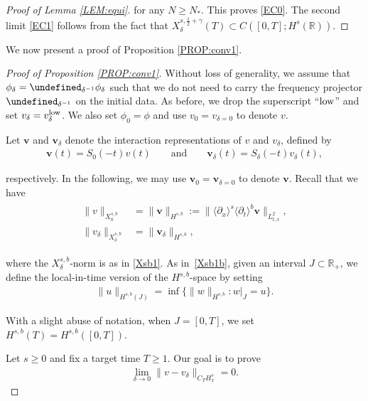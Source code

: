\documentclass[letterpaper, 11pt,  reqno]{amsart}
\newcommand{\1}{\hspace{0.5mm}\textup{I}\hspace{0.5mm}}
\newcommand{\noi}{\noindent}
\newcommand{\R}{\mathbb{R}}
\let\P= \undefined
\newcommand{\P}{\mathbf{P}}
\newcommand{\low}{\textup{low}}
\newcommand{\dl}{\delta}
\newcommand{\dx}{\partial_x}
\newcommand{\dt}{\partial_t}
\newcommand{\jb}[1]
{\langle #1 \rangle}
\newcommand{\vv}{\mathbf{v}}
\numberwithin{equation}{section}
\numberwithin{theorem}{section}
\begin{document}
\begin{proof}[Proof of Lemma \ref{LEM:equi}]
\noi
for any $N \ge N_*$.
This proves 
 \eqref{EC0}.
The second limit  \eqref{EC1}  follows from the fact that 
$X^{s,\frac12+\gamma}_\dl(T)\subset C([0,T];H^s(\R))$.
\end{proof}






We now present a proof of Proposition \ref{PROP:conv1}.


\begin{proof}[Proof of Proposition \ref{PROP:conv1}]
Without loss of generality, we assume that 
$\phi_ \dl = \P_{ \dl^{-1}} \phi_\dl$
such that we do not need to carry the frequency projector
$\P_{ \dl^{-1}}$ on the initial data.
As before,  we drop the superscript ``$\low$''
and set 
$v_\dl = v_\dl^\low$.
We also set $\phi_0 = \phi$
and use $v_0 = v_{\dl = 0}$ to denote $v$.










Let $\vv$ and $\vv_\dl$
denote the interaction representations
of $v$ and $v_\dl$,  defined by 
\begin{align}
\vv(t) = S_0(-t) v(t)\qquad \text{and}
\qquad 
\vv_\dl(t) = S_\dl(-t) v_\dl(t), 
\label{int1}
\end{align}

\noi
respectively.
In the following, we may use $\vv_0 = \vv_{\dl = 0}$ to denote $\vv$.
Recall that we have
\begin{align}
\begin{split}
\| v\|_{X^{s, b}_0} 
& =
\| \vv\|_{H^{s, b}} 
:= 
\|\jb{\dx}^s \jb{\dt}^b \vv\|_{L^2_{t, x}} , 
\\
\| v_\dl\|_{X^{s, b}_\dl} 
& =
\| \vv_\dl\|_{H^{s, b}} , 
\end{split}
\label{int2}
\end{align}


\noi
where 
 the $X^{s, b}_\dl$-norm is as in 
\eqref{Xsb1}.
As in~\eqref{Xsb1b},
given an interval $J \subset\R_+$, 
 we define the 
local-in-time version of the $H^{s, b}$-space
by setting
 \begin{align*}
\| u\|_{H^{s, b}(J)} =\inf\big\{\| w\|_{H^{s, b}}: w|_{J}=u\big\}.
\end{align*}

\noi
With a slight abuse of notation, 
when $J = [0, T]$, we set 
$H^{s, b}(T) = H^{s, b}([0, T])$.




Let $ s\ge 0$ and fix a target time $T \ge 1$.
Our goal is to prove
\begin{align}
\lim_{\dl\to 0}\|v - v_\dl\|_{C_{T}H^s_x}
= 0.
\label{BBen1}
\end{align}


\end{proof}
\end{document}
